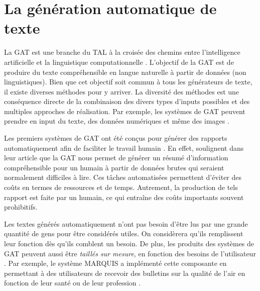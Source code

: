 
\chapter{La génération automatique de texte}


La \acf{GAT} est une branche du \acf{TAL} à la croisée des chemins entre l'intelligence artificielle et la linguistique computationnelle \citep{ReiterBuildingNaturalLanguage2000}. L'objectif de la \ac{GAT} est de produire du texte compréhensible en langue naturelle à partir de données (non linguistiques). Bien que cet objectif soit commun à tous les générateurs de texte, il existe diverses méthodes pour y arriver. La diversité des méthodes est une conséquence directe de la combinaison des divers types d'inputs possibles et des multiples approches de réalisation. Par exemple, les systèmes de \ac{GAT} peuvent prendre en input du texte, des données numériques et même des images \citep{thomason:coling14}.

Les premiers systèmes de \ac{GAT} ont été conçus pour générer des rapports automatiquement afin de faciliter le travail humain \citep{ReiterBuildingNaturalLanguage2000}. En effet, \cite{DaoustJSREALTextRealizer2015} soulignent dans leur article que la \ac{GAT} nous permet de générer un résumé d'information compréhensible pour un humain à partir de données brutes qui seraient normalement difficiles à lire. Ces tâches automatisées permettent d'éviter des coûts en termes de ressources et de temps. Autrement, la production de tels rapport est faite par un humain, ce qui entraîne des coûts importants souvent prohibitifs.

Les textes générés automatiquement n'ont pas besoin d'être lus par une grande quantité de gens pour être considérés utiles. On considèrera qu'ils remplissent leur fonction dès qu'ils comblent un besoin. De plus, les produits des systèmes de \ac{GAT} peuvent aussi être \emph{taillés sur mesure}, en fonction des besoins de l'utilisateur \citep{1948c0b7a8ca42679cad977bb2cdddc2}. Par exemple, le système MARQUIS a implémenté cette composante en permettant à des utilisateurs de recevoir des bulletins sur la qualité de l'air en fonction de leur santé ou de leur profession \citep{WannerMARQUISGENERATIONUSERTAILORED2010}.

